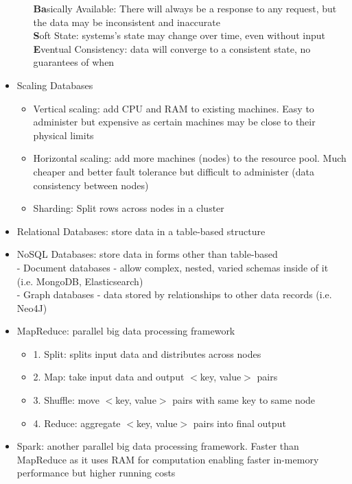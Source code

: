 \documentclass{article}
\begin{document}
\begin{multicols*}{2}
\begin{itemize}[noitemsep]
\begin{itemize}
            \textbf{Ba}sically Available: There will always be a response to any request, but 
            the data may be inconsistent and inaccurate \\
            \textbf{S}oft State: systems's state may change over time, even without input \\
            \textbf{E}ventual Consistency: data will converge to a consistent state, no guarantees of when
        \end{itemize}
        \item Scaling Databases
        \begin{itemize}
            \item Vertical scaling: add CPU and RAM to existing machines. 
            Easy to administer but expensive as certain machines may be close to their physical limits
            \item Horizontal scaling: add more machines (nodes) to the resource pool. 
            Much cheaper and better fault tolerance but difficult to administer (data consistency between nodes)
            \item Sharding: Split rows across nodes in a cluster
        \end{itemize}
        \item Relational Databases: store data in a table-based structure
        \item NoSQL Databases: store data in forms other than 
        table-based \\
        - Document databases - allow complex, nested, varied schemas inside of it (i.e. MongoDB, Elasticsearch) \\
        - Graph databases - data stored by relationships to other data records (i.e. Neo4J)
        \item MapReduce: parallel big data processing framework 
        \begin{itemize}
            \item 1. Split: splits input data and distributes across nodes
            \item 2. Map: take input data and output $<$key, value$>$ pairs 
            \item 3. Shuffle: move $<$key, value$>$ pairs with same key to same node
            \item 4. Reduce: aggregate $<$key, value$>$ pairs into final output
        \end{itemize}
        \item Spark: another parallel big data processing framework. Faster than MapReduce as 
        it uses RAM for computation enabling faster in-memory performance but higher running costs
    \end{itemize}

\end{multicols*}
\end{document}
